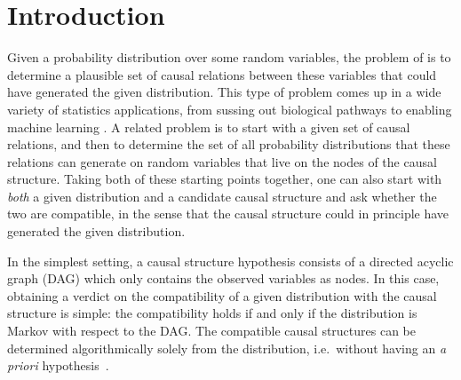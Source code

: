 
\section{Introduction}

Given a probability distribution over some random variables, the problem of  is to determine a plausible set of causal relations between these variables that could have generated the given distribution. This type of problem comes up in a wide variety of statistics applications, from sussing out biological pathways to enabling machine learning \cite{pearl2009causality,spirtes2011causation,studeny2005probabilistic,koller2009probabilistic}. A related problem is to start with a given set of causal relations, and then to determine the set of all probability distributions that these relations can generate on random variables that live on the nodes of the causal structure. Taking both of these starting points together, one can also start with \emph{both} a given distribution and a candidate causal structure and ask whether the two are compatible, in the sense that the causal structure could in principle have generated the given distribution.


In the simplest setting, a causal structure hypothesis consists of a directed acyclic graph (DAG) which only contains the observed variables as nodes. In this case, obtaining a verdict on the compatibility of a given distribution with the causal structure is simple: the compatibility holds if and only if the distribution is Markov with respect to the DAG. The compatible causal structures can be determined algorithmically solely from the distribution, i.e.~without having an \emph{a priori} hypothesis~\cite{pearl2009causality}.

